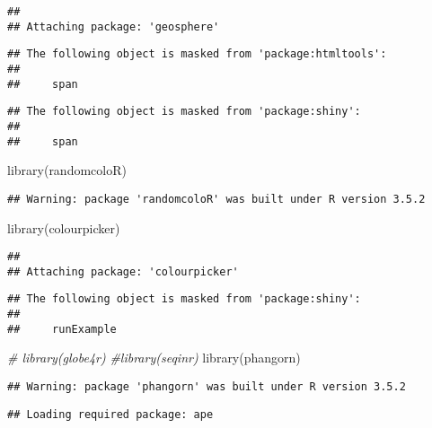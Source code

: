 \documentclass[
]{article}
\newenvironment{Shaded}{\begin{snugshade}}{\end{snugshade}}
\newcommand{\CommentTok}[1]{\textcolor[rgb]{0.56,0.35,0.01}{\textit{#1}}}
\newcommand{\FunctionTok}[1]{\textcolor[rgb]{0.00,0.00,0.00}{#1}}
\newcommand{\NormalTok}[1]{#1}
\begin{document}
\begin{verbatim}
## 
## Attaching package: 'geosphere'
\end{verbatim}

\begin{verbatim}
## The following object is masked from 'package:htmltools':
## 
##     span
\end{verbatim}

\begin{verbatim}
## The following object is masked from 'package:shiny':
## 
##     span
\end{verbatim}

\begin{Shaded}
\begin{Highlighting}[]
\FunctionTok{library}\NormalTok{(randomcoloR)}
\end{Highlighting}
\end{Shaded}

\begin{verbatim}
## Warning: package 'randomcoloR' was built under R version 3.5.2
\end{verbatim}

\begin{Shaded}
\begin{Highlighting}[]
\FunctionTok{library}\NormalTok{(colourpicker)}
\end{Highlighting}
\end{Shaded}

\begin{verbatim}
## 
## Attaching package: 'colourpicker'
\end{verbatim}

\begin{verbatim}
## The following object is masked from 'package:shiny':
## 
##     runExample
\end{verbatim}

\begin{Shaded}
\begin{Highlighting}[]
\CommentTok{\# library(globe4r)}
\CommentTok{\#library(seqinr)}
\FunctionTok{library}\NormalTok{(phangorn)}
\end{Highlighting}
\end{Shaded}

\begin{verbatim}
## Warning: package 'phangorn' was built under R version 3.5.2
\end{verbatim}

\begin{verbatim}
## Loading required package: ape
\end{verbatim}
\end{document}
